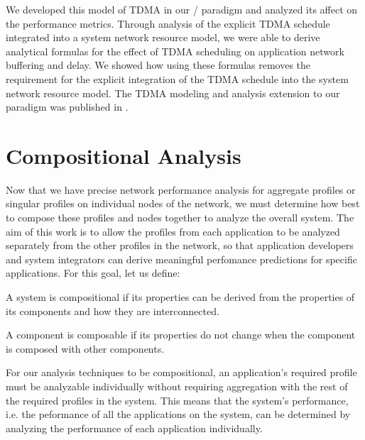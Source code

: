 We developed this model of TDMA in our \shorttool/ paradigm and
analyzed its affect on the performance metrics.  Through analysis of
the explicit TDMA schedule integrated into a system network resource
model, we were able to derive analytical formulas for the effect of
TDMA scheduling on application network buffering and delay.  We showed
how using these formulas removes the requirement for the explicit
integration of the TDMA schedule into the system network resource
model.  The TDMA modeling and analysis extension to our paradigm was
published in \cite{ISIS_F6_ISORC_QOS:15}.

\newpage

\section{Compositional Analysis}
\label{sec:compositional_analysis}

Now that we have precise network performance analysis for aggregate
profiles or singular profiles on individual nodes of the network, we
must determine how best to compose these profiles and nodes together
to analyze the overall system.  The aim of this work is to allow the
profiles from each application to be analyzed separately from the
other profiles in the network, so that application developers and
system integrators can derive meaningful perfomance predictions for
specific applications.  For this goal, let us define:

\begin{definition}[Compositionality]\cite{sifakis2002}
  A system is compositional if its properties can be derived from
  the properties of its components and how they are interconnected.
\end{definition}

\begin{definition}[Composability]\cite{sifakis2002}
  A component is composable if its properties do not change
  when the component is composed with other components.
\end{definition}

For our analysis techniques to be compositional, an application's
required profile must be analyzable individually without requiring
aggregation with the rest of the required profiles in the system.
This means that the system's performance, i.e. the peformance of all
the applications on the system, can be determined by analyzing the
performance of each application individually.

